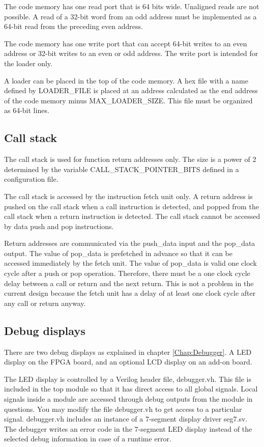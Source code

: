 \documentclass[11pt,a4paper,oneside,openright]{report}
\newcommand{\vv}{ \vspace{2mm} }   %
\begin{document}
The code memory has one read port that is 64 bits wide. Unaligned reads are not possible. A read of a 32-bit word from an odd address must be implemented as a 64-bit read from the preceding even address.
\vv

The code memory has one write port that can accept 64-bit writes to an even address or 32-bit writes to an even or odd address. The write port is intended for the loader only.
\vv

A loader can be placed in the top of the code memory. A hex file with a name defined by LOADER\_FILE is placed at an address calculated as the end address of the code memory minus MAX\_LOADER\_SIZE. This file must be organized as 64-bit lines.
\vv


\subsection{Call stack}
The call stack is used for function return addresses only. The size is a power of 2 determined by the variable CALL\_STACK\_POINTER\_BITS defined in a configuration file.
\vv

The call stack is accessed by the instruction fetch unit only. A return address is pushed on the call stack when a call instruction is detected, and popped from the call stack when a return instruction is detected. The call stack cannot be accessed by data push and pop instructions.
\vv

Return addresses are communicated via the push\_data input and the pop\_data output. The value of pop\_data is prefetched in advance so that it can be accessed immediately by the fetch unit. The value of pop\_data is valid one clock cycle after a push or pop operation. Therefore, there must be a one clock cycle delay between a call or return and the next return. This is not a problem in the current design because the fetch unit has a delay of at least one clock cycle after any call or return anyway.
\vv


\subsection{Debug displays}
There are two debug displays as explained in chapter \ref{Chap:Debugger}. A LED display on the FPGA board, and an optional LCD display on an add-on board.
\vv

The LED display is controlled by a Verilog header file, debugger.vh. This file is included in the top module so that it has direct access to all global signals. Local signals inside a module are accessed through debug outputs from the module in questions. You may modify the file debugger.vh to get access to a particular signal. debugger.vh includes an instance of a 7-segment display driver seg7.sv. The debugger writes an error code in the 7-segment LED display instead of the selected debug information in case of a runtime error.
\vv
\end{document}
